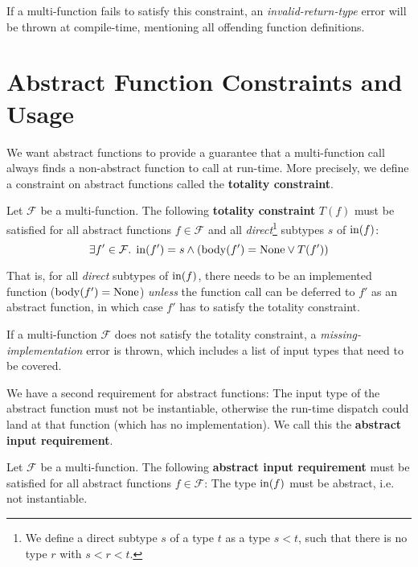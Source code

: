 If a multi-function fails to satisfy this constraint, an \textit{invalid-return-type} error will be thrown at compile-time, mentioning all offending function definitions.



\section{Abstract Function Constraints and Usage}

We want abstract functions to provide a guarantee that a multi-function call always finds a non-abstract function to call at run-time. More precisely, we define a constraint on abstract functions called the \textbf{totality constraint}.

\begin{definition}
	Let $\mathcal{F}$ be a multi-function. The following \textbf{totality constraint} $T(f)$ must be satisfied for all abstract functions $f \in \mathcal{F}$ and all \textit{direct}\footnote{We define a direct subtype $s$ of a type $t$ as a type $s < t$, such that there is no type $r$ with $s < r < t$.} subtypes $s$ of $\operatorname{in}(f)$:
	\begin{equation*}
		\exists f' \in \mathcal{F}.\; \operatorname{in}(f') = s \land (\operatorname{body}(f') = \text{None} \lor T(f'))
	\end{equation*}
\end{definition}

\noindent That is, for all \textit{direct} subtypes of $\operatorname{in}(f)$, there needs to be an implemented function ($\operatorname{body}(f') = \text{None}$) \textit{unless} the function call can be deferred to $f'$ as an abstract function, in which case $f'$ has to satisfy the totality constraint.

If a multi-function $\mathcal{F}$ does not satisfy the totality constraint, a \textit{missing-implementation} error is thrown, which includes a list of input types that need to be covered.

\medskip

\noindent We have a second requirement for abstract functions: The input type of the abstract function must not be instantiable, otherwise the run-time dispatch could land at that function (which has no implementation). We call this the \textbf{abstract input requirement}.

\begin{definition}
	Let $\mathcal{F}$ be a multi-function. The following \textbf{abstract input requirement} must be satisfied for all abstract functions $f \in \mathcal{F}$: The type $\operatorname{in}(f)$ must be abstract, i.e. not instantiable.
\end{definition}


